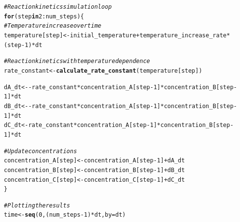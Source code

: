 \documentclass{tufte-handout}\usepackage[]{graphicx}\usepackage[]{xcolor}
\makeatletter
\newcommand{\hlnum}[1]{\textcolor[rgb]{0.686,0.059,0.569}{#1}}%
\newcommand{\hlcom}[1]{\textcolor[rgb]{0.678,0.584,0.686}{\textit{#1}}}%
\newcommand{\hlopt}[1]{\textcolor[rgb]{0,0,0}{#1}}%
\newcommand{\hlstd}[1]{\textcolor[rgb]{0.345,0.345,0.345}{#1}}%
\newcommand{\hlkwa}[1]{\textcolor[rgb]{0.161,0.373,0.58}{\textbf{#1}}}%
\newcommand{\hlkwb}[1]{\textcolor[rgb]{0.69,0.353,0.396}{#1}}%
\newcommand{\hlkwc}[1]{\textcolor[rgb]{0.333,0.667,0.333}{#1}}%
\newcommand{\hlkwd}[1]{\textcolor[rgb]{0.737,0.353,0.396}{\textbf{#1}}}%
\newenvironment{kframe}{%
 \def\at@end@of@kframe{}%
 \ifinner\ifhmode%
  \def\at@end@of@kframe{\end{minipage}}%
  \begin{minipage}{\columnwidth}%
 \fi\fi%
 \def\FrameCommand##1{\hskip\@totalleftmargin \hskip-\fboxsep
 \colorbox{shadecolor}{##1}\hskip-\fboxsep
     \hskip-\linewidth \hskip-\@totalleftmargin \hskip\columnwidth}%
 \MakeFramed {\advance\hsize-\width
   \@totalleftmargin\z@ \linewidth\hsize
   \@setminipage}}%
 {\par\unskip\endMakeFramed%
 \at@end@of@kframe}
\newenvironment{knitrout}{}{} %
\makeatother
\begin{document}
\begin{knitrout}
\begin{kframe}
\begin{alltt}
\hlcom{# Reaction kinetics simulation loop}
\hlkwa{for} \hlstd{(step} \hlkwa{in} \hlnum{2}\hlopt{:}\hlstd{num_steps) \{}
  \hlcom{# Temperature increase over time}
  \hlstd{temperature[step]} \hlkwb{<-} \hlstd{initial_temperature} \hlopt{+} \hlstd{temperature_increase_rate} \hlopt{*} \hlstd{(step} \hlopt{-} \hlnum{1}\hlstd{)} \hlopt{*} \hlstd{dt}

  \hlcom{# Reaction kinetics with temperature dependence}
  \hlstd{rate_constant} \hlkwb{<-} \hlkwd{calculate_rate_constant}\hlstd{(temperature[step])}

  \hlstd{dA_dt} \hlkwb{<-} \hlopt{-}\hlstd{rate_constant} \hlopt{*} \hlstd{concentration_A[step} \hlopt{-} \hlnum{1}\hlstd{]} \hlopt{*} \hlstd{concentration_B[step} \hlopt{-} \hlnum{1}\hlstd{]} \hlopt{*} \hlstd{dt}
  \hlstd{dB_dt} \hlkwb{<-} \hlopt{-}\hlstd{rate_constant} \hlopt{*} \hlstd{concentration_A[step} \hlopt{-} \hlnum{1}\hlstd{]} \hlopt{*} \hlstd{concentration_B[step} \hlopt{-} \hlnum{1}\hlstd{]} \hlopt{*} \hlstd{dt}
  \hlstd{dC_dt} \hlkwb{<-} \hlstd{rate_constant} \hlopt{*} \hlstd{concentration_A[step} \hlopt{-} \hlnum{1}\hlstd{]} \hlopt{*} \hlstd{concentration_B[step} \hlopt{-} \hlnum{1}\hlstd{]} \hlopt{*} \hlstd{dt}

  \hlcom{# Update concentrations}
  \hlstd{concentration_A[step]} \hlkwb{<-} \hlstd{concentration_A[step} \hlopt{-} \hlnum{1}\hlstd{]} \hlopt{+} \hlstd{dA_dt}
  \hlstd{concentration_B[step]} \hlkwb{<-} \hlstd{concentration_B[step} \hlopt{-} \hlnum{1}\hlstd{]} \hlopt{+} \hlstd{dB_dt}
  \hlstd{concentration_C[step]} \hlkwb{<-} \hlstd{concentration_C[step} \hlopt{-} \hlnum{1}\hlstd{]} \hlopt{+} \hlstd{dC_dt}
\hlstd{\}}

\hlcom{# Plotting the results}
\hlstd{time} \hlkwb{<-} \hlkwd{seq}\hlstd{(}\hlnum{0}\hlstd{, (num_steps} \hlopt{-} \hlnum{1}\hlstd{)} \hlopt{*} \hlstd{dt,} \hlkwc{by} \hlstd{= dt)}


\end{alltt}
\end{kframe}
\end{knitrout}
\end{document}
